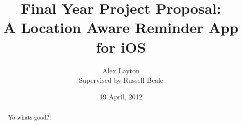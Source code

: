 \documentclass[10pt, a4paper]{article}
\title{
  {\small Final Year Project Proposal:}\\
  {A Location Aware Reminder App for iOS}}
\author{
  Alex Layton \\ 
  \small{Supervised by Russell Beale}}
\date{19 April, 2012}
\begin{document}
\maketitle

\begin{abstract}
	Yo whats good?!
\end{abstract}
\end{document}
